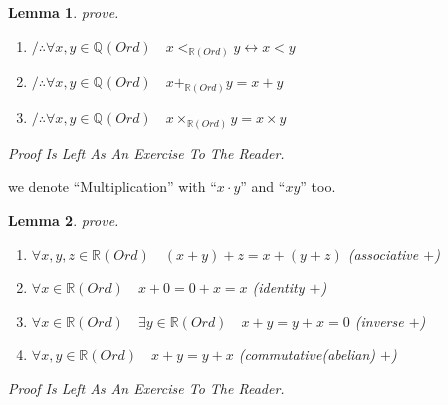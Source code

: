 \documentclass[10pt,a4paper]{book}
\newtheorem{lemma}{Lemma}[section]
\begin{document}
\begin{lemma}prove.
    \begin{enumerate}
        \setlength{\itemsep}{0pt} %
        \item       $/ \therefore   \forall x,y \in \mathbb{Q} (Ord) \quad x <_{\mathbb{R} (Ord)} y  \leftrightarrow x  < y$
        \item       $/ \therefore   \forall x,y \in \mathbb{Q} (Ord) \quad x +_{\mathbb{R} (Ord)} y  = x  + y$
        \item       $/ \therefore   \forall x,y \in \mathbb{Q} (Ord) \quad x \times_{\mathbb{R} (Ord)} y  = x  \times y$
    \end{enumerate}
    Proof Is Left As An Exercise To The Reader.
\end{lemma}

we denote ``Multiplication'' with ``$x \cdot y$'' and ``$x y$'' too.

\begin{lemma}prove.
    \begin{enumerate}
        \setlength{\itemsep}{0pt} %
        \item       $\forall x ,y ,z  \in \mathbb{R} (Ord) \quad (x +y )+z  = x +(y +z )  $  (associative $+$)
        \item       $\forall x \in \mathbb{R} (Ord) \quad x + 0 = 0 + x = x$  (identity  $+$)
        \item       $\forall x \in \mathbb{R} (Ord) \quad \exists y \in \mathbb{R} (Ord) \quad x + y = y + x = 0$ (inverse  $+$)
        \item       $\forall x ,y  \in \mathbb{R} (Ord) \quad x +y  = y +x $  (commutative(abelian)  $+$)
    \end{enumerate}
    Proof Is Left As An Exercise To The Reader.
\end{lemma}
\end{document}
